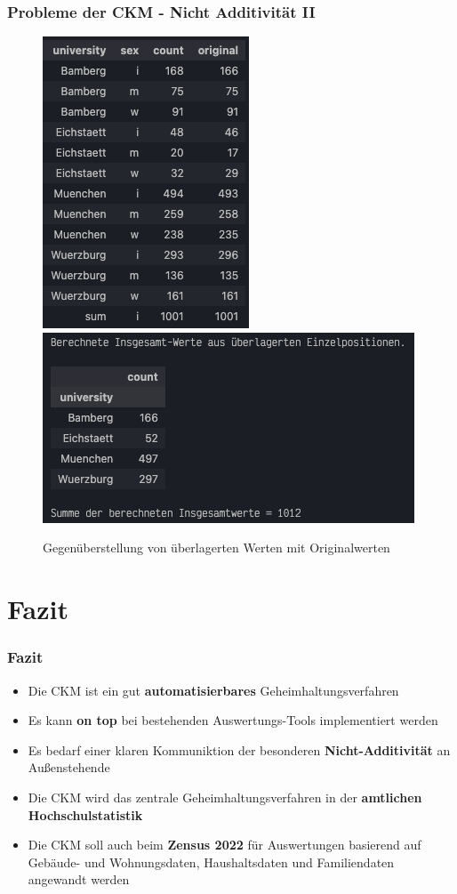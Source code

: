 \documentclass[aspectratio=169]{beamer}
\begin{document}
\begin{frame}{}
	\frametitle{Probleme der CKM - Nicht Additivität II}
    \begin{figure}
		\centering
        \includegraphics[width=0.25\linewidth]{img/ckm_6.png}
        \includegraphics[width=0.55\linewidth]{img/ckm_7.png}
        \caption{Gegenüberstellung von überlagerten Werten mit Originalwerten}
	\end{figure} 
\end{frame}


\section{Fazit}

\begin{frame}{}
	\frametitle{Fazit}
    \begin{itemize}
        \item Die CKM ist ein gut \textbf{automatisierbares} Geheimhaltungsverfahren
        \item Es kann \textbf{on top} bei bestehenden Auswertungs-Tools implementiert werden
        \item Es bedarf einer klaren Kommuniktion der besonderen \textbf{Nicht-Additivität} an Außenstehende
        \item Die CKM wird das zentrale Geheimhaltungsverfahren in der \textbf{amtlichen Hochschulstatistik}
        \item Die CKM soll auch beim \textbf{Zensus 2022} für Auswertungen basierend auf Gebäude- und Wohnungsdaten, Haushaltsdaten und Familiendaten angewandt werden \footnotemark {}
    \end{itemize}
\end{frame}
\end{document}
